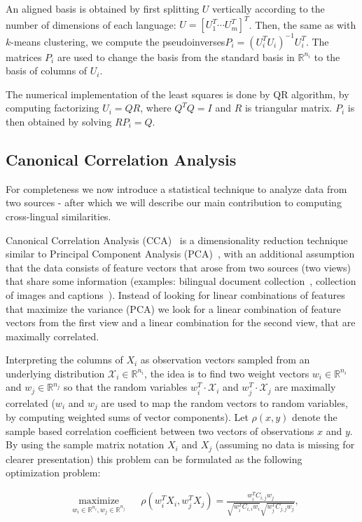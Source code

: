 \documentclass[twoside,11pt]{article}
\newcommand{\RR}{\mathbb{R}}
\begin{document}
An aligned basis is obtained by first splitting $U$ vertically according to the number of dimensions of each language: $U = [U_1^T \cdots U_m^T]^T$. Then, the same as with $k$-means clustering, we compute the pseudoinverses$P_i = (U_i^T U_i)^{-1} U_i^T$. The matrices $P_i$ are used to change the basis from the standard basis in $\RR^{n_i}$ to the basis of columns of $U_i$.

The numerical implementation of the least squares is done by QR algorithm, by computing factorizing $U_i = Q R$, where $Q^TQ = I$ and $R$ is triangular matrix. $P_i$ is then obtained by solving $R P_i = Q$.


\subsection{Canonical Correlation Analysis}
 For completeness we now introduce a statistical technique to analyze data from two sources - after which we will describe our main contribution to computing cross-lingual similarities.

 Canonical Correlation Analysis (CCA)~\cite{Hotelling} is a dimensionality reduction technique similar to Principal Component Analysis (PCA)~\cite{Pearson1901On}, with an additional assumption that the data consists of feature vectors that arose from two sources (two views) that share some information (examples: bilingual document collection~\cite{mrpqr}, collection of images and captions~\cite{Hardoon_usingimage}). Instead of looking for linear combinations of features that maximize the variance (PCA) we look for a linear combination of feature vectors from the first view and a linear combination for the second view, that are maximally correlated.

Interpreting the columns of $X_i$ as observation vectors sampled from an underlying distribution $\mathcal{X}_i \in \RR^{n_i}$, the idea is to find two weight vectors $w_i \in \RR^{n_i}$ and $w_j \in \RR^{n_j}$ so that the random variables $w_i^T \cdot \mathcal{X}_i$ and $w_j^T \cdot \mathcal{X}_j$ are maximally correlated ($w_i$ and $w_j$ are used to map the random vectors to random variables, by computing weighted sums of vector components). Let $\rho(x,y)$ denote the sample based correlation coefficient between two vectors of observations $x$ and $y$. By using the sample matrix notation $X_i$ and $X_j$ (assuming no data is missing for clearer presentation) this problem can be formulated as the following optimization problem:

\begin{equation*}
\begin{aligned}
& \underset{w_i \in \RR^{n_i}, w_j \in \RR^{n_j}}{\text{maximize}}
& & \rho(w_i^T X_i , w_j^T X_j) = \frac{w_i^T C_{i,j} w_j}{\sqrt{w_i^T C_{i,i} w_i} \sqrt{w_j^T C_{j,j} w_j}},
\end{aligned}
\end{equation*}
\end{document}
